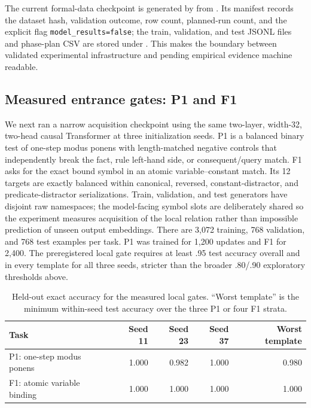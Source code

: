 \documentclass[10pt]{article}
\begin{document}
The current formal-data checkpoint is generated by  from . Its manifest records the dataset hash, validation outcome, row count, planned-run count, and the explicit flag \texttt{model\_results=false}; the train, validation, and test JSONL files and phase-plan CSV are stored under . This makes the boundary between validated experimental infrastructure and pending empirical evidence machine readable.

\subsection{Measured entrance gates: P1 and F1}
We next ran a narrow acquisition checkpoint using the same two-layer, width-32,
two-head causal Transformer at three initialization seeds. P1 is a balanced binary
test of one-step modus ponens with length-matched negative controls that independently
break the fact, rule left-hand side, or consequent/query match. F1 asks for the exact
bound symbol in an atomic variable--constant match. Its 12 targets are exactly balanced
within canonical, reversed, constant-distractor, and predicate-distractor serializations.
Train, validation, and test generators have disjoint raw namespaces; the model-facing
symbol slots are deliberately shared so the experiment measures acquisition of the
local relation rather than impossible prediction of unseen output embeddings. There
are 3,072 training, 768 validation, and 768 test examples per task. P1 was trained for
1,200 updates and F1 for 2,400. The preregistered local gate requires at least .95 test
accuracy overall and in every template for all three seeds, stricter than the broader
.80/.90 exploratory thresholds above.

\begin{table}[H]
\centering
\caption{Held-out exact accuracy for the measured local gates. ``Worst template'' is
the minimum within-seed test accuracy over the three P1 or four F1 strata.}
\begin{tabular}{lrrrr}
\toprule
Task & Seed 11 & Seed 23 & Seed 37 & Worst template\\
\midrule
P1: one-step modus ponens & 1.000 & 0.982 & 1.000 & 0.980\\
F1: atomic variable binding & 1.000 & 1.000 & 1.000 & 1.000\\
\bottomrule
\end{tabular}
\end{table}
\end{document}
